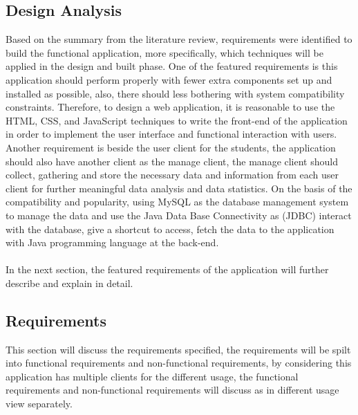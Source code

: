 \documentclass[12pt]{article}
\begin{document}
\subsection{Design Analysis}
Based on the summary from the literature review, requirements were identified to build the functional application, more specifically, which techniques will be applied in the design and built phase. One of the featured requirements is this application should perform properly with fewer extra components set up and installed as possible, also, there should less bothering with system compatibility constraints. Therefore, to design a web application, it is reasonable to use the HTML, CSS, and JavaScript techniques to write the front-end of the application in order to implement the user interface and functional interaction with users. Another requirement is beside the user client for the students, the application should also have another client as the manage client, the manage client should collect, gathering and store the necessary data and information from each user client for further meaningful data analysis and data statistics. On the basis of the compatibility and popularity, using MySQL as the database management system to manage the data and use the Java Data Base Connectivity as (JDBC) interact with the database, give a shortcut to access, fetch the data to the application with Java programming language at the back-end.
\\
\\In the next section, the featured requirements of the application will further describe and explain in detail. 
\subsection{Requirements}
This section will discuss the requirements specified, the requirements will be spilt into functional requirements and non-functional requirements, by considering this application has multiple clients for the different usage, the functional requirements and non-functional requirements will discuss as in different usage view separately.
\end{document}

